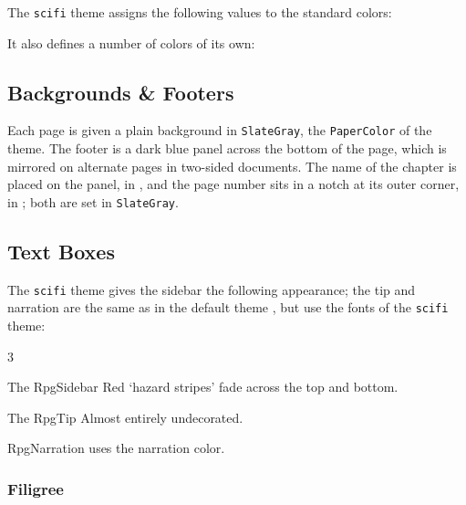 			The \texttt{scifi} theme assigns the following values to the standard colors:

			\noindent\DefaultSwatches{}

			It also defines a number of colors of its own:

			\noindent{}

		\subsection{Backgrounds \& Footers}

			Each page is given a plain background in \texttt{SlateGray}, the \texttt{PaperColor} of the theme. The footer is a dark blue panel across the bottom of the page, which is mirrored on alternate pages in two-sided documents. The name of the chapter is placed on the panel, in , and the page number sits in a notch at its outer corner, in ; both are set in \texttt{SlateGray}.

		\subsection{Text Boxes}

			The \texttt{scifi} theme gives the sidebar the following appearance; the tip and narration are the same as in the default theme , but use the fonts of the \texttt{scifi} theme:

			\begin{multicols}{3}

				\begin{RpgSidebar}{The RpgSidebar}
					Red `hazard stripes' fade across the top and bottom.
				\end{RpgSidebar}

				\begin{RpgTip}{The RpgTip}
					Almost entirely undecorated.
				\end{RpgTip}

				\begin{RpgNarration}
					RpgNarration uses the narration color.
				\end{RpgNarration}
			\end{multicols}

			\subsubsection{Filigree}\label{S:ScifiFiligree}

